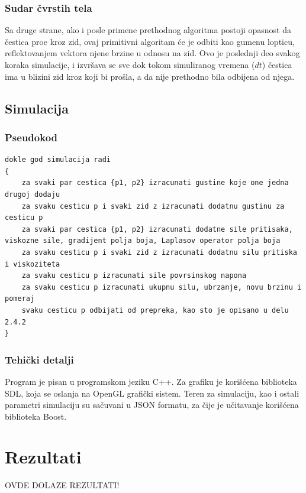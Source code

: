 \documentclass[12pt]{article}
\begin{document}
        \subsubsection{Sudar \v cvrstih tela}
            Sa druge strane, ako i posle primene prethodnog algoritma postoji opasnost da \v cestica pro\dj e kroz zid, ovaj primitivni algoritam \'ce je odbiti kao gumenu lopticu, reflektovanjem vektora njene brzine u odnosu na zid. Ovo je poslednji deo svakog koraka simulacije, i izvr\v sava se sve dok tokom simuliranog vremena ($dt$) \v cestica ima u blizini zid kroz koji bi pro\v sla, a da nije prethodno bila odbijena od njega.
    \subsection{Simulacija}
        \subsubsection{Pseudokod}
        \lstset{breaklines=true}
            \begin{lstlisting}
dokle god simulacija radi
{
    za svaki par cestica {p1, p2} izracunati gustine koje one jedna drugoj dodaju
    za svaku cesticu p i svaki zid z izracunati dodatnu gustinu za cesticu p
    za svaki par cestica {p1, p2} izracunati dodatne sile pritisaka, viskozne sile, gradijent polja boja, Laplasov operator polja boja
    za svaku cesticu p i svaki zid z izracunati dodatnu silu pritiska i viskoziteta
    za svaku cesticu p izracunati sile povrsinskog napona
    za svaku cesticu p izracunati ukupnu silu, ubrzanje, novu brzinu i pomeraj
    svaku cesticu p odbijati od prepreka, kao sto je opisano u delu 2.4.2
}
            \end{lstlisting}
        \subsubsection{Tehi\v cki detalji}
            Program je pisan u programskom jeziku C++. Za grafiku je kori\v s\'cena biblioteka SDL, koja se oslanja na OpenGL grafi\v cki sistem.
            Teren za simulaciju, kao i ostali parametri simulaciju su sa\v cuvani u JSON formatu, za \v cije je u\v citavanje kori\v s\'cena biblioteka Boost.
    \section{Rezultati}
        OVDE DOLAZE REZULTATI!
\newpage


\end{document}
